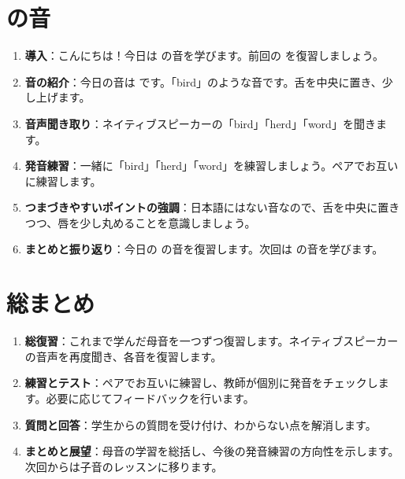 \documentclass[book,jafontscale=0.9247]{jlreq}
\begin{document}
\section{ の音}
\begin{enumerate}
    \item \textbf{導入}：こんにちは！今日は  の音を学びます。前回の  を復習しましょう。
    \item \textbf{音の紹介}：今日の音は  です。「bird」のような音です。舌を中央に置き、少し上げます。
    \item \textbf{音声聞き取り}：ネイティブスピーカーの「bird」「herd」「word」を聞きます。
    \item \textbf{発音練習}：一緒に「bird」「herd」「word」を練習しましょう。ペアでお互いに練習します。
    \item \textbf{つまづきやすいポイントの強調}：日本語にはない音なので、舌を中央に置きつつ、唇を少し丸めることを意識しましょう。
    \item \textbf{まとめと振り返り}：今日の  の音を復習します。次回は  の音を学びます。
\end{enumerate}


\section{総まとめ}
\begin{enumerate}
    \item \textbf{総復習}：これまで学んだ母音を一つずつ復習します。ネイティブスピーカーの音声を再度聞き、各音を復習します。
    \item \textbf{練習とテスト}：ペアでお互いに練習し、教師が個別に発音をチェックします。必要に応じてフィードバックを行います。
    \item \textbf{質問と回答}：学生からの質問を受け付け、わからない点を解消します。
    \item \textbf{まとめと展望}：母音の学習を総括し、今後の発音練習の方向性を示します。次回からは子音のレッスンに移ります。
\end{enumerate}
\end{document}
